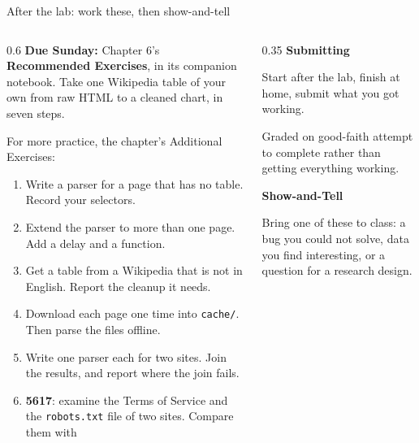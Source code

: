 \documentclass[9pt,aspectratio=169]{beamer}
\begin{document}
\begin{frame}{After the lab: work these, then show-and-tell}
    \begin{columns}[T]
        \begin{column}{0.6\textwidth}
            \textbf{Due Sunday:} Chapter 6's \textbf{Recommended Exercises}, in its companion notebook. Take one Wikipedia table of your own from raw HTML to a cleaned chart, in seven steps.

            \medskip
            For more practice, the chapter's Additional Exercises:
            \begin{enumerate}\small
                \item Write a parser for a page that has no table. Record your selectors.
                \item Extend the parser to more than one page. Add a delay and a function.
                \item Get a table from a Wikipedia that is not in English. Report the cleanup it needs.
                \item Download each page one time into \texttt{cache/}. Then parse the files offline.
                \item Write one parser each for two sites. Join the results, and report where the join fails.
                \item \textbf{5617}: examine the Terms of Service and the \texttt{robots.txt} file of two sites. Compare them with \textcite{fiesler2020no}
            \end{enumerate}
        \end{column}
        \begin{column}{0.35\textwidth}
            \textbf{Submitting}\\[2pt]
            {\footnotesize Start after the lab, finish at home, submit what you got working.

            \smallskip
            Graded on good-faith attempt to complete rather than getting everything working.\par}
            \medskip
            \textbf{Show-and-Tell}\\[2pt]
            {\footnotesize Bring one of these to class: a bug you could not solve, data you find interesting, or a question for a research design.\par}
        \end{column}
    \end{columns}
\end{frame}
\end{document}
